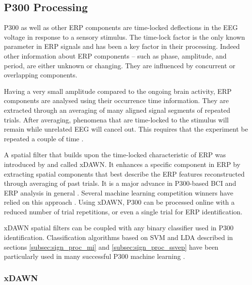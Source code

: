 \subsection{P300 Processing}%
\label{subsec:sign_proc_p300}

P300 as well as other ERP components are time-locked deflections in the EEG voltage in response to a sensory stimulus.
The time-lock factor is the only known parameter in ERP signals and has been a key factor in their processing. 
Indeed other information about ERP components -- such as phase, amplitude, and period, are either unknown or changing.
They are influenced by concurrent or overlapping components. 

Having a very small amplitude compared to the ongoing brain activity, ERP components are analysed using their occurrence time information.
They are extracted through an averaging of many aligned signal segments of repeated trials. 
After averaging, phenomena that are time-locked to the stimulus will remain while unrelated EEG will cancel out.
This requires that the experiment be repeated a couple of time \citep{rakotomamonjy_ensemble_2005}.

A spatial filter that builds upon the time-locked characteristic of ERP was introduced by \cite{rivet_xdawn_2009} and called xDAWN.
It enhances a specific component in ERP by extracting spatial components that best describe the ERP features reconstructed through averaging of past trials.
It is a major advance in P300-based BCI and ERP analysis in general \citep{rivet_theoretical_2011}. 
Several machine learning competition winners have relied on this approach \citep{barachant_plug&play_2014, barachant_p300-speller:_2015}. 
Using xDAWN, P300 can be processed online with a reduced number of trial repetitions, or even a single trial for ERP identification. 

xDAWN spatial filters can be coupled with any binary classifier used in P300 identification. 
Classification algorithms based on SVM and LDA described in sections \ref{subsec:sign_proc_mi} and \ref{subsec:sign_proc_ssvep} have been particularly used in many successful P300 machine learning \citep{rakotomamonjy_ensemble_2005, krusienski_toward_2008, rivet_xdawn_2009, jrad_sw-svm:_2011, cecotti_robust_2011, mak_optimizing_2011}. 

\subsubsection{xDAWN}  

